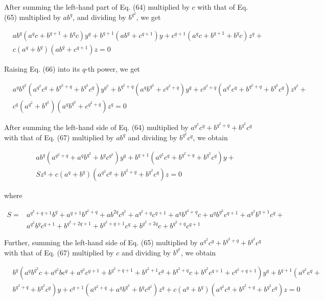 \documentclass[10pt]{article}
\begin{document}
After summing the left-hand part of Eq. (64) multiplied by $c$ with that of Eq. (65) multiplied by $a b^{q}$, and dividing by $b^{q^{2}}$, we get


\begin{align*}
& a b^{q}\left(a^{q} c+b^{q+1}+b^{q} c\right) y^{q}+b^{q+1}\left(a b^{q}+c^{q+1}\right) y+c^{q+1}\left(a^{q} c+b^{q+1}+b^{q} c\right) z^{q}+ \\
& c\left(a^{q}+b^{q}\right)\left(a b^{q}+c^{q+1}\right) z=0 \tag{66}
\end{align*}


Raising Eq. (66) into its $q$-th power, we get


\begin{align*}
& a^{q} b^{q^{2}}\left(a^{q^{2}} c^{q}+b^{q^{2}+q}+b^{q^{2}} c^{q}\right) y^{q^{2}}+b^{q^{2}+q}\left(a^{q} b^{q^{2}}+c^{q^{2}+q}\right) y^{q}+c^{q^{2}+q}\left(a^{q^{2}} c^{q}+b^{q^{2}+q}+b^{q^{2}} c^{q}\right) z^{q^{2}}+ \\
& c^{q}\left(a^{q^{2}}+b^{q^{2}}\right)\left(a^{q} b^{q^{2}}+c^{q^{2}+q}\right) z^{q}=0 \tag{67}
\end{align*}


After summing the left-hand side of Eq. (64) multiplied by $a^{q^{2}} c^{q}+b^{q^{2}+q}+b^{q^{2}} c^{q}$ with that of Eq. (67) multiplied by $a b^{q}$ and dividing by $b^{q^{2}} c^{q}$, we obtain


\begin{align*}
& a b^{q}\left(a^{q^{2}+q}+a^{q} b^{q^{2}}+b^{q} c^{q^{2}}\right) y^{q}+b^{q+1}\left(a^{q^{2}} c^{q}+b^{q^{2}+q}+b^{q^{2}} c^{q}\right) y+ \\
& S z^{q}+c\left(a^{q}+b^{q}\right)\left(a^{q^{2}} c^{q}+b^{q^{2}+q}+b^{q^{2}} c^{q}\right) z=0 \tag{68}
\end{align*}


where

$$
\begin{aligned}
S= & a^{q^{2}+q+1} b^{q}+a^{q+1} b^{q^{2}+q}+a b^{2 q} c^{q^{2}}+a^{q^{2}+q} c^{q+1}+a^{q} b^{q^{2}+q} c+a^{q} b^{q^{2}} c^{q+1}+a^{q^{2}} b^{q+1} c^{q}+ \\
& a^{q^{2}} b^{q} c^{q+1}+b^{q^{2}+2 q+1}+b^{q^{2}+q+1} c^{q}+b^{q^{2}+2 q} c+b^{q^{2}+q} c^{q+1}
\end{aligned}
$$

Further, summing the left-hand side of Eq. (65) multiplied by $a^{q^{2}} c^{q}+b^{q^{2}+q}+b^{q^{2}} c^{q}$ with that of Eq. (67) multiplied by $c$ and dividing by $b^{q^{2}}$, we obtain


\begin{align*}
& b^{q}\left(a^{q} b^{q^{2}} c+a^{q^{2}} b c^{q}+a^{q^{2}} c^{q+1}+b^{q^{2}+q+1}+b^{q^{2}+1} c^{q}+b^{q^{2}+q} c+b^{q^{2}} c^{q+1}+c^{q^{2}+q+1}\right) y^{q}+b^{q+1}\left(a^{q^{2}} c^{q}+\right. \\
& \left.b^{q^{2}+q}+b^{q^{2}} c^{q}\right) y+c^{q+1}\left(a^{q^{2}+q}+a^{q} b^{q^{2}}+b^{q} c^{q^{2}}\right) z^{q}+c\left(a^{q}+b^{q}\right)\left(a^{q^{2}} c^{q}+b^{q^{2}+q}+b^{q^{2}} c^{q}\right) z=0 \tag{69}
\end{align*}
\end{document}
